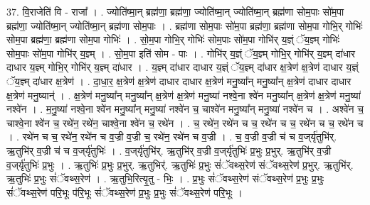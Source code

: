 \documentclass[17pt]{extarticle}
\begin{document}
37. वि॒राजेति॑ वि - राजा᳚ । . ज्योति॑ष्मा॒न् ब्रह्म॑णा॒ ब्रह्म॑णा॒ ज्योति॑ष्मा॒न् ज्योति॑ष्मा॒न् ब्रह्म॑णा सोम॒पाः सो॑म॒पा ब्रह्म॑णा॒ ज्योति॑ष्मा॒न् ज्योति॑ष्मा॒न् ब्रह्म॑णा सोम॒पाः । . ब्रह्म॑णा सोम॒पाः सो॑म॒पा ब्रह्म॑णा॒ ब्रह्म॑णा सोम॒पा गोभि॒र् गोभिः॑ सोम॒पा ब्रह्म॑णा॒ ब्रह्म॑णा सोम॒पा गोभिः॑ । . सो॒म॒पा गोभि॒र् गोभिः॑ सोम॒पाः सो॑म॒पा गोभि॑र् य॒ज्ञ्ं ॅय॒ज्ञ्म् गोभिः॑ सोम॒पाः सो॑म॒पा गोभि॑र् य॒ज्ञ्म् । . सो॒म॒पा इति॑ सोम - पाः । . गोभि॑र् य॒ज्ञ्ं ॅय॒ज्ञ्म् गोभि॒र् गोभि॑र् य॒ज्ञ्म् दा॑धार दाधार य॒ज्ञ्म् गोभि॒र् गोभि॑र् य॒ज्ञ्म् दा॑धार । . य॒ज्ञ्म् दा॑धार दाधार य॒ज्ञ्ं ॅय॒ज्ञ्म् दा॑धार क्ष॒त्रेण॑ क्ष॒त्रेण॑ दाधार य॒ज्ञ्ं ॅय॒ज्ञ्म् दा॑धार क्ष॒त्रेण॑ । . दा॒धा॒र॒ क्ष॒त्रेण॑ क्ष॒त्रेण॑ दाधार दाधार क्ष॒त्रेण॑ मनु॒ष्या᳚न् मनु॒ष्या᳚न् क्ष॒त्रेण॑ दाधार 
दाधार क्ष॒त्रेण॑ मनु॒ष्यान्॑ । . क्ष॒त्रेण॑ मनु॒ष्या᳚न् मनु॒ष्या᳚न् क्ष॒त्रेण॑ क्ष॒त्रेण॑ मनु॒ष्या॑ नश्वे॒ना श्वे॑न मनु॒ष्या᳚न् क्ष॒त्रेण॑ क्ष॒त्रेण॑ मनु॒ष्या॑ नश्वे॑न । . म॒नु॒ष्या॑ नश्वे॒ना श्वे॑न मनु॒ष्या᳚न् मनु॒ष्या॑ नश्वे॑न च॒ चाश्वे॑न मनु॒ष्या᳚न् मनु॒ष्या॑ नश्वे॑न च । . अश्वे॑न च॒ चाश्वे॒ना श्वे॑न च॒ रथे॑न॒ रथे॑न॒ चाश्वे॒ना श्वे॑न च॒ रथे॑न । . च॒ रथे॑न॒ रथे॑न च च॒ रथे॑न च च॒ रथे॑न च च॒ रथे॑न च । . रथे॑न च च॒ रथे॑न॒ रथे॑न च व॒ज्री व॒ज्री च॒ रथे॑न॒ रथे॑न च व॒ज्री । . च॒ व॒ज्री व॒ज्री च॑ च व॒ज्‌र्यृ॑तुभि॑र्. ऋ॒तुभि॑र् व॒ज्री च॑ च व॒ज्‌र्यृ॑तुभिः॑ । . व॒ज्‌र्यृ॑तुभि॑र्. ऋ॒तुभि॑र् व॒ज्री व॒ज्‌र्यृ॑तुभिः॑ प्र॒भुः प्र॒भुर्. ऋ॒तुभि॑र् व॒ज्री व॒ज्‌र्यृ॑तुभिः॑ प्र॒भुः । . ऋ॒तुभिः॑ प्र॒भुः प्र॒भुर्. ऋ॒तुभिर्॑. ऋ॒तुभिः॑ प्र॒भुः सं॑ॅवथ्स॒रेण॑ संॅवथ्स॒रेण॑ प्र॒भुर्. ऋ॒तुभि॑र्. 
ऋ॒तुभिः॑ प्र॒भुः सं॑ॅवथ्स॒रेण॑ । . ऋ॒तुभि॒रित्यृ॒तु - भिः॒ । . प्र॒भुः सं॑ॅवथ्स॒रेण॑ संॅवथ्स॒रेण॑ प्र॒भुः प्र॒भुः सं॑ॅवथ्स॒रेण॑ परि॒भूः प॑रि॒भूः सं॑ॅवथ्स॒रेण॑ प्र॒भुः प्र॒भुः सं॑ॅवथ्स॒रेण॑ परि॒भूः । \newline
\end{document}

